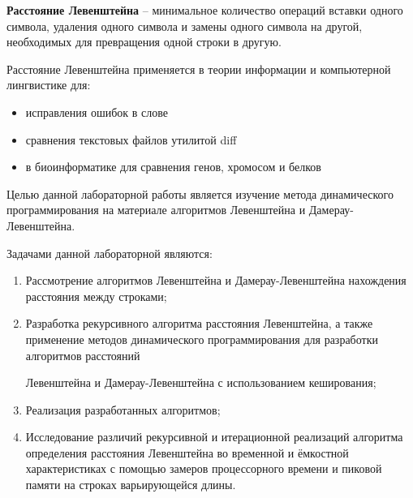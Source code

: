 
\textbf{Расстояние Левенштейна} \cite{levenshtein} – минимальное количество операций вставки одного символа, удаления одного символа и замены одного символа на другой, необходимых для превращения одной строки в другую.

Расстояние Левенштейна применяется в теории информации и компьютерной лингвистике для:

\begin{itemize}
	\item исправления ошибок в слове
	\item сравнения текстовых файлов утилитой diff
	\item в биоинформатике для сравнения генов, хромосом и белков
\end{itemize}

Целью данной лабораторной работы является изучение метода динамического программирования на материале алгоритмов
Левенштейна и Дамерау-Левенштейна. 

Задачами данной лабораторной являются:
\begin{enumerate}
	\item Рассмотрение алгоритмов Левенштейна и Дамерау-Левенштейна нахождения расстояния между строками;
	\item Разработка рекурсивного алгоритма расстояния Левенштейна, а также применение методов динамического программирования для разработки алгоритмов расстояний 
	
	Левенштейна и Дамерау-Левенштейна с использованием кеширования; 
	\item Реализация разработанных алгоритмов; 
	\item Исследование различий рекурсивной и
	итерационной реализаций алгоритма определения расстояния Левенштейна во временной и ёмкостной характеристиках с помощью замеров процессорного времени и пиковой памяти на строках варьирующейся длины.
\end{enumerate}
\newpage

\clearpage

